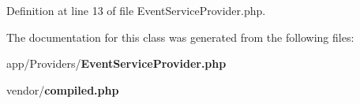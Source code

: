 Definition at line 13 of file Event\+Service\+Provider.\+php.



The documentation for this class was generated from the following files\+:\begin{DoxyCompactItemize}
\item 
app/\+Providers/{\bf Event\+Service\+Provider.\+php}\item 
vendor/{\bf compiled.\+php}\end{DoxyCompactItemize}
